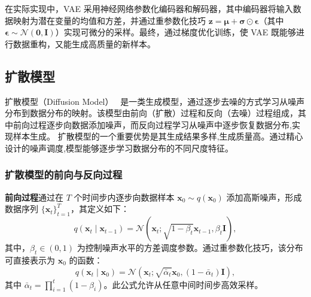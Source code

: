 在实际实现中，VAE 采用神经网络参数化编码器和解码器，其中编码器将输入数据映射为潜在变量的均值和方差，并通过重参数化技巧 $\mathbf{z} = \boldsymbol{\mu} + \boldsymbol{\sigma} \odot \boldsymbol{\epsilon}$（其中 $\boldsymbol{\epsilon} \sim \mathcal{N}(\mathbf{0}, \mathbf{I})$）实现可微分的采样。最终，通过梯度优化训练，使 VAE 既能够进行数据重构，又能生成高质量的新样本。


\subsection{扩散模型}
扩散模型（Diffusion Model）~\cite{ho2020ddpm} 是一类生成模型，通过逐步去噪的方式学习从噪声分布到数据分布的映射。该模型由前向（扩散）过程和反向（去噪）过程组成，其中前向过程逐步向数据添加噪声，而反向过程学习从噪声中逐步恢复数据分布,实现样本生成。
扩散模型的一个重要优势是其生成结果多样,生成质量高。通过精心设计的噪声调度,模型能够逐步学习数据分布的不同尺度特征。


\subsubsection{扩散模型的前向与反向过程}
\textbf{前向过程}通过在 $T$ 个时间步内逐步向数据样本 $\mathbf{x}_0 \sim q(\mathbf{x}_0)$ 添加高斯噪声，形成数据序列 $\{\mathbf{x}_t\}_{t=1}^{T}$，其定义如下：
\begin{equation}
    q(\mathbf{x}_t \mid \mathbf{x}_{t-1}) = \mathcal{N}(\mathbf{x}_t; \sqrt{1 - \beta_t} \mathbf{x}_{t-1}, \beta_t \mathbf{I}),
\end{equation}
其中，$\beta_t \in (0,1)$ 为控制噪声水平的方差调度参数。通过重参数化技巧，该分布可直接表示为 $\mathbf{x}_0$ 的函数：
\begin{equation}
    q(\mathbf{x}_t \mid \mathbf{x}_0) = \mathcal{N}(\mathbf{x}_t; \sqrt{\bar{\alpha}_t} \mathbf{x}_0, (1 - \bar{\alpha}_t) \mathbf{I}),
\end{equation}
其中 $\bar{\alpha}_t = \prod_{i=1}^{t} (1 - \beta_i)$。此公式允许从任意中间时间步高效采样。

